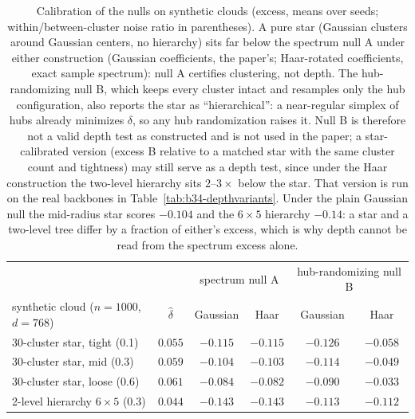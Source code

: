 \begin{table}[H]
\centering
\small
\setlength{\tabcolsep}{4pt}
\begin{tabular}{lc|cc|cc}
\toprule
& & \multicolumn{2}{c|}{spectrum null A} & \multicolumn{2}{c}{hub-randomizing null B} \\
synthetic cloud ($n{=}1000$, $d{=}768$) & $\hat\delta$ & Gaussian & Haar & Gaussian & Haar \\
\midrule
30-cluster star, tight (0.1) & $0.055$ & $-0.115$ & $-0.115$ & $-0.126$ & $-0.058$ \\
30-cluster star, mid (0.3) & $0.059$ & $-0.104$ & $-0.103$ & $-0.114$ & $-0.049$ \\
30-cluster star, loose (0.6) & $0.061$ & $-0.084$ & $-0.082$ & $-0.090$ & $-0.033$ \\
2-level hierarchy $6\times5$ (0.3) & $0.044$ & $-0.143$ & $-0.143$ & $-0.113$ & $-0.112$ \\
\bottomrule
\end{tabular}
\caption{Calibration of the nulls on synthetic clouds (excess, means over seeds; within/between-cluster noise ratio in parentheses). A pure star (Gaussian clusters around Gaussian centers, no hierarchy) sits far below the spectrum null A under either construction (Gaussian coefficients, the paper's; Haar-rotated coefficients, exact sample spectrum): null A certifies clustering, not depth. The hub-randomizing null B, which keeps every cluster intact and resamples only the hub configuration, also reports the star as ``hierarchical'': a near-regular simplex of hubs already minimizes $\delta$, so any hub randomization raises it. Null B is therefore not a valid depth test as constructed and is not used in the paper; a star-calibrated version (excess B relative to a matched star with the same cluster count and tightness) may still serve as a depth test, since under the Haar construction the two-level hierarchy sits $2$--$3\times$ below the star. That version is run on the real backbones in Table~\ref{tab:b34-depthvariants}. Under the plain Gaussian null the mid-radius star scores $-0.104$ and the $6{\times}5$ hierarchy $-0.14$: a star and a two-level tree differ by a fraction of either's excess, which is why depth cannot be read from the spectrum excess alone.}
\label{tab:b25-star}
\end{table}
